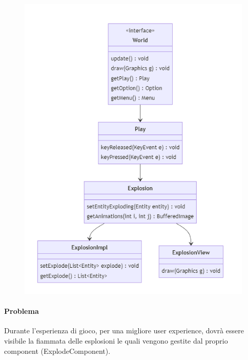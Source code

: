 \documentclass[a4paper,12pt]{report}
\begin{document}
\begin{figure}[H]
    \centering{}
    \includegraphics[width=\textwidth]{img/UMLExplosion.png}
    \caption{}
\end{figure}

\paragraph{Problema} Durante l'esperienza di gioco, per una migliore user experience, dovrà essere visibile la fiammata delle esplosioni le quali vengono gestite dal proprio component (ExplodeComponent).
\end{document}
